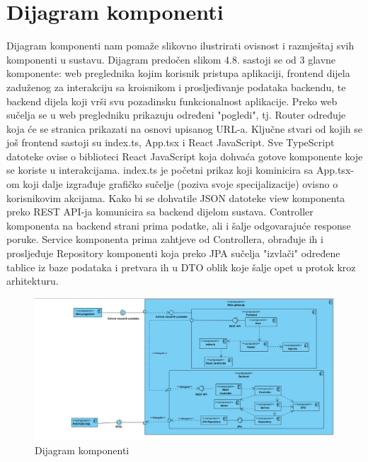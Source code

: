 			\eject
		\section{Dijagram komponenti}
		
			Dijagram komponenti nam pomaže slikovno ilustrirati ovisnost i razmještaj svih komponenti u sustavu. Dijagram predočen slikom 4.8. sastoji se od 3 glavne komponente: web preglednika kojim korisnik pristupa aplikaciji, frontend dijela zaduženog za interakciju sa kroisnikom i prosljeđivanje podataka backendu, te backend dijela koji vrši svu pozadinsku funkcionalnost aplikacije. Preko web sučelja se u web pregledniku prikazuju određeni "pogledi", tj. Router određuje koja će se stranica prikazati na osnovi upisanog URL-a. Ključne stvari od kojih se još frontend sastoji su index.ts, App.tsx i React JavaScript.  Sve TypeScript datoteke ovise o biblioteci React JavaScript koja dohvaća gotove komponente koje se koriste u interakcijama. index.ts je početni prikaz koji kominicira sa App.tsx-om koji dalje izgrađuje grafičko sučelje (poziva svoje specijalizacije) ovisno o korisnikovim akcijama. Kako bi se dohvatile JSON datoteke view komponenta preko REST API-ja komunicira sa backend dijelom sustava. Controller komponenta na backend strani prima podatke, ali i šalje odgovarajuće response poruke. Service komponenta prima zahtjeve od Controllera, obrađuje ih i prosljeđuje Repository komponenti koja preko JPA sučelja "izvlači" određene tablice iz baze podataka i pretvara ih u DTO oblik koje šalje opet u protok kroz arhitekturu.
			
			\begin{figure}[H]
			\includegraphics[scale=0.5]{slike/compDiagram.PNG} %
			\centering
			\caption{Dijagram komponenti}
			\label{fig:bazapod}
		\end{figure}